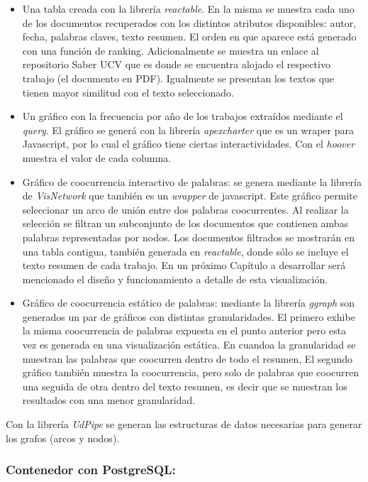 \documentclass[
  10,
  spanish,
  openany]{book}
\begin{document}
\begin{itemize}
\item
  Una tabla creada con la librería \emph{reactable}. En la misma se muestra cada uno de los documentos recuperados con los distintos atributos disponibles: autor, fecha, palabras claves, texto resumen. El orden en que aparece está generado con una función de ranking. Adicionalmente se muestra un enlace al repositorio Saber UCV que es donde se encuentra alojado el respectivo trabajo (el documento en PDF). Igualmente se presentan los textos que tienen mayor similitud con el texto seleccionado.
\item
  Un gráfico con la frecuencia por año de los trabajos extraídos mediante el \emph{query}. El gráfico se generá con la librería \emph{apexcharter} que es un wraper para Javascript, por lo cual el gráfico tiene ciertas interactividades. Con el \emph{hoover} muestra el valor de cada columna.
\item
  Gráfico de coocurrencia interactivo de palabras: se genera mediante la librería de \emph{VisNetwork} que también es un \emph{wrapper} de javascript. Este gráfico permite seleccionar un arco de unión entre dos palabras coocurrentes. Al realizar la selección se filtran un subconjunto de los documentos que contienen ambas palabras representadas por nodos. Los documentos filtrados se mostrarán en una tabla contigua, también generada en \emph{reactable}, donde sólo se incluye el texto resumen de cada trabajo. En un próximo Capítulo a desarrollar será mencionado el diseño y funcionamiento a detalle de esta visualización.
\item
  Gráfico de coocurrencia estático de palabras: mediante la librería \emph{ggraph} son generados un par de gráficos con distintas granularidades. El primero exhibe la misma coocurrencia de palabras expuesta en el punto anterior pero esta vez es generada en una visualización estática. En cuandoa la granularidad se muestran las palabras que coocurren dentro de todo el resumen, El segundo gráfico también muestra la coocurrencia, pero solo de palabras que coocurren una seguida de otra dentro del texto resumen, es decir que se muestran los resultados con una menor granularidad.
\end{itemize}

Con la librería \emph{UdPipe} se generan las estructuras de datos necesarias para generar los grafos (arcos y nodos).

\hypertarget{conposgres}{%
\subsubsection{Contenedor con PostgreSQL:}\label{conposgres}}
\end{document}
